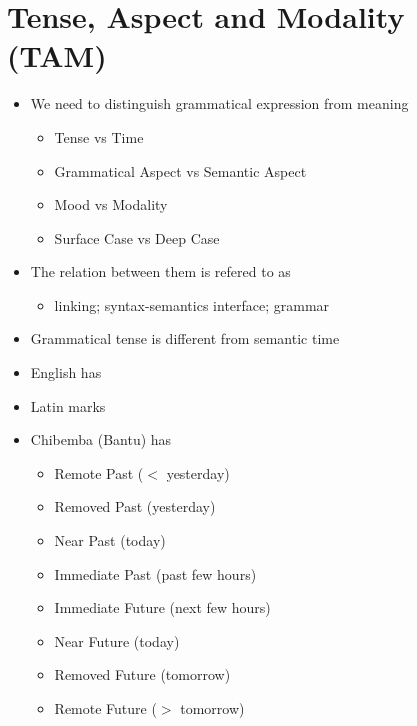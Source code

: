 \documentclass[a4paper,landscape,headrule,footrule,xetex]{foils}
\begin{document}
\small



\section{Tense, Aspect and Modality (TAM)}

\begin{itemize}
\item  We need to distinguish grammatical expression from 
  meaning
  \begin{itemize}
  \item  Tense vs Time
  \item  Grammatical Aspect vs Semantic Aspect
  \item  Mood vs Modality
  \item  Surface Case vs Deep Case
  \end{itemize}
\item  The relation between them is refered to as
  \begin{itemize}
  \item  linking; syntax-semantics interface; grammar
  \end{itemize}
\end{itemize} 
 

\begin{itemize}
\item  Grammatical tense is different from semantic time
\item  English has 
\item  Latin marks 
\item  Chibemba (Bantu) has 
  \begin{multicols}{2}
  \begin{itemize}
  \item  Remote Past ($<$ yesterday)
  \item  Removed Past (yesterday)
  \item  Near Past (today)
  \item  Immediate Past (past few hours)
  \item Immediate Future (next few hours)
  \item Near Future (today)
  \item Removed Future (tomorrow)
  \item Remote Future ($>$ tomorrow)
  \end{itemize}
\end{multicols}
\end{itemize}
\end{document}
